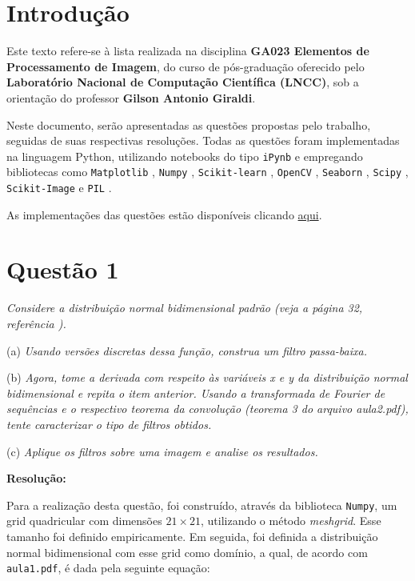 \documentclass[a4paper, 11pt]{article}
\begin{document}
\tableofcontents
\newpage

\section{\textbf{Introdução}}

Este texto refere-se à lista realizada na disciplina \textbf{GA023 Elementos de Processamento de Imagem}, do curso de pós-graduação oferecido pelo \textbf{Laboratório Nacional de Computação Científica (LNCC)}, sob a orientação do professor \textbf{Gilson Antonio Giraldi}. 

Neste documento, serão apresentadas as questões propostas pelo trabalho, seguidas de suas respectivas resoluções. Todas as questões foram implementadas na linguagem Python, utilizando notebooks do tipo \texttt{iPynb} e empregando bibliotecas como \texttt{Matplotlib} \cite{matplotlib}, \texttt{Numpy} \cite{numpy}, \texttt{Scikit-learn} \cite{scikit-learn}, \texttt{OpenCV} \cite{opencv}, \texttt{Seaborn} \cite{seaborn}, \texttt{Scipy} \cite{scipy}, \texttt{Scikit-Image} \cite{scikit-image} e \texttt{PIL} \cite{pillow}.

As implementações das questões estão disponíveis clicando \href{https://github.com/lorran-araujo/LNCC/tree/main/disciplinas/processamento-imagens/lista-2}{aqui}.



\section{\textbf{Questão 1}}
\noindent \textit{Considere a distribuição normal bidimensional padrão (veja a página 32, referência \cite{jain}).}

(a) \textit{Usando versões discretas dessa função, construa um filtro passa-baixa.}

(b) \textit{Agora, tome a derivada com respeito às variáveis x e y da distribuição normal bidimensional e repita o item anterior. Usando a transformada de Fourier de sequências e o respectivo teorema da convolução (teorema 3 do arquivo aula2.pdf), tente caracterizar o tipo de filtros obtidos.}

(c) \textit{Aplique os filtros sobre uma imagem e analise os resultados.}

\textbf{Resolução:}

Para a realização desta questão, foi construído, através da biblioteca \texttt{Numpy}, um grid quadricular com dimensões $21 \times 21$, utilizando o método \textit{meshgrid}. Esse tamanho foi definido empiricamente. Em seguida, foi definida a distribuição normal bidimensional com esse grid como domínio, a qual, de acordo com \texttt{aula1.pdf}, é dada pela seguinte equação:
\end{document}
